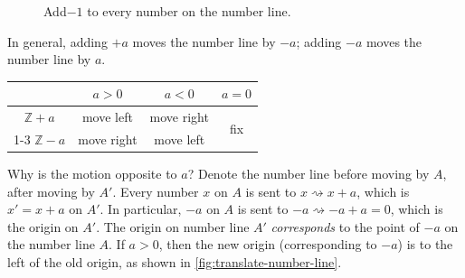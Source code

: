 \documentclass[b5paper]{article}
\begin{document}
\begin{figure}[htbp]
  \centering
  \caption{Add$-1$ to every number on the number line.}
  \label{fig:minus-1-numline}
\end{figure}

In general, adding $+a$ moves the number line by $-a$; adding $-a$ moves the number line by $a$.

\begin{center}
  \begin{tabular}{c|c|c|c}
                   & $a > 0$ & $a < 0$ & $a = 0$ \\
  \hline
  $\mathbb{Z} + a$ & move left     & move right    & \multirow{2}{*}{fix} \\
  \cline{1-3}
  $\mathbb{Z} - a$ & move right     & move left
  \end{tabular}
\end{center}

Why is the motion opposite to $a$? Denote the number line before moving by $A$, after moving by $A'$. Every number $x$ on $A$ is sent to $x \rightsquigarrow x + a$, which is $x' = x + a$ on $A'$. In particular, $-a$ on $A$ is sent to $-a \rightsquigarrow -a + a = 0$, which is the origin on $A'$. The origin on number line $A'$ {\em corresponds} to the point of $-a$ on the number line $A$. If $a > 0$, then the new origin (corresponding to $-a$) is to the left of the old origin, as shown in \cref{fig:translate-number-line}.
\end{document}
